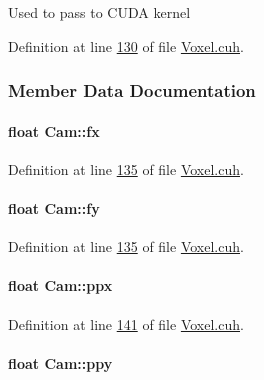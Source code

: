 Used to pass to C\+U\+DA kernel 

Definition at line \hyperlink{Voxel_8cuh_source_l00130}{130} of file \hyperlink{Voxel_8cuh_source}{Voxel.\+cuh}.



\subsubsection{Member Data Documentation}
\paragraph[{\texorpdfstring{fx}{fx}}]{\setlength{\rightskip}{0pt plus 5cm}float Cam\+::fx}\hypertarget{structCam_a7d82658b0f9a7df54516cffb6d67ac07}{}\label{structCam_a7d82658b0f9a7df54516cffb6d67ac07}


Definition at line \hyperlink{Voxel_8cuh_source_l00135}{135} of file \hyperlink{Voxel_8cuh_source}{Voxel.\+cuh}.

\paragraph[{\texorpdfstring{fy}{fy}}]{\setlength{\rightskip}{0pt plus 5cm}float Cam\+::fy}\hypertarget{structCam_a2c80b4688fa8d02ad6c645246b6ea0d4}{}\label{structCam_a2c80b4688fa8d02ad6c645246b6ea0d4}


Definition at line \hyperlink{Voxel_8cuh_source_l00135}{135} of file \hyperlink{Voxel_8cuh_source}{Voxel.\+cuh}.

\paragraph[{\texorpdfstring{ppx}{ppx}}]{\setlength{\rightskip}{0pt plus 5cm}float Cam\+::ppx}\hypertarget{structCam_a0d44db9d2a2e8c416cbf9cd30b6cd6f1}{}\label{structCam_a0d44db9d2a2e8c416cbf9cd30b6cd6f1}


Definition at line \hyperlink{Voxel_8cuh_source_l00141}{141} of file \hyperlink{Voxel_8cuh_source}{Voxel.\+cuh}.

\paragraph[{\texorpdfstring{ppy}{ppy}}]{\setlength{\rightskip}{0pt plus 5cm}float Cam\+::ppy}\hypertarget{structCam_a5af4cee2ad3b008befb9626990dfbff2}{}\label{structCam_a5af4cee2ad3b008befb9626990dfbff2}


